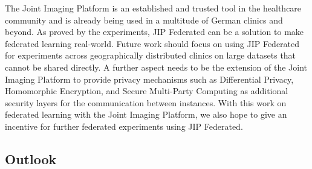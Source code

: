 The Joint Imaging Platform is an established and trusted tool in the healthcare community and is already being used in a multitude of German clinics and beyond.
As proved by the experiments, JIP Federated can be a solution to make federated learning real-world.
Future work should focus on using JIP Federated for experiments across  geographically distributed clinics on large datasets that cannot be shared directly.
A further aspect needs to be the extension of the Joint Imaging Platform to provide privacy mechanisms such as Differential Privacy, Homomorphic Encryption, and Secure Multi-Party Computing as additional security layers for the communication between instances.
With this work on federated learning with the Joint Imaging Platform, we also hope to give an incentive for further federated experiments using JIP Federated.

\subsection{Outlook}
\label{subsec:Outlook}


